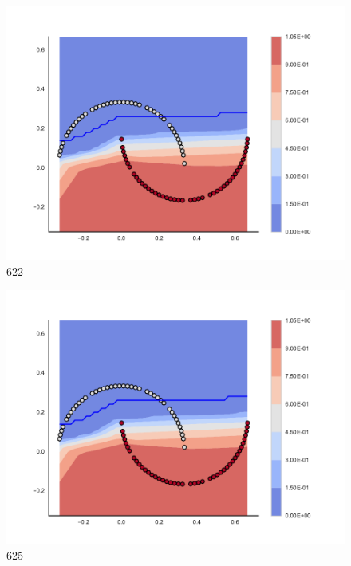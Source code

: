 \begin{subfigure}[b]{0.09\textwidth}
    \includegraphics[clip, trim=2.35cm 1.75cm 4.5cm 0cm,width=\textwidth]{img/convergence/622.pdf}
    \caption{622}
    \label{fig:convergence_622}
\end{subfigure}
%
\begin{subfigure}[b]{0.09\textwidth}
    \includegraphics[clip, trim=2.35cm 1.75cm 4.5cm 0cm,width=\textwidth]{img/convergence/625.pdf}
    \caption{625}
    \label{fig:convergence_625}
\end{subfigure}
%
